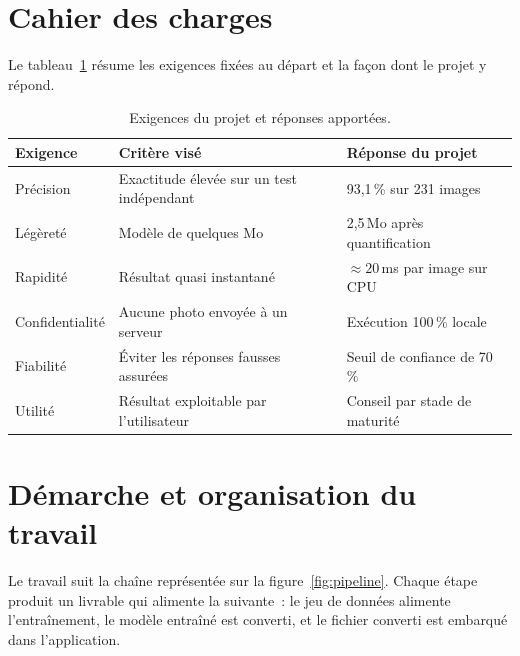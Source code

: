 \section{Cahier des charges}

Le tableau~\ref{tab:cahier} résume les exigences fixées au départ et la façon dont le projet y répond.

\begin{table}[H]
\centering
\caption{Exigences du projet et réponses apportées.}\label{tab:cahier}
\small
\begin{tabularx}{\textwidth}{@{}p{3.0cm}X X@{}}
\toprule
\textbf{Exigence} & \textbf{Critère visé} & \textbf{Réponse du projet} \\
\midrule
Précision & Exactitude élevée sur un test indépendant & 93,1\,\% sur 231 images \\
Légèreté & Modèle de quelques Mo & 2,5\,Mo après quantification \\
Rapidité & Résultat quasi instantané & $\approx 20$\,ms par image sur CPU \\
Confidentialité & Aucune photo envoyée à un serveur & Exécution 100\,\% locale \\
Fiabilité & Éviter les réponses fausses assurées & Seuil de confiance de 70\,\% \\
Utilité & Résultat exploitable par l’utilisateur & Conseil par stade de maturité \\
\bottomrule
\end{tabularx}
\end{table}

\section{Démarche et organisation du travail}

Le travail suit la chaîne représentée sur la figure~\ref{fig:pipeline}. Chaque étape produit un livrable qui alimente la suivante~: le jeu de données alimente l’entraînement, le modèle entraîné est converti, et le fichier converti est embarqué dans l’application.

